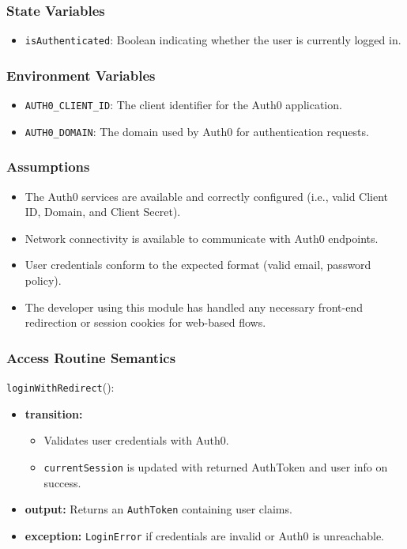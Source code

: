 \documentclass[12pt, titlepage]{article}
\begin{document}
\subsubsection{State Variables}

\begin{itemize}
    \item \texttt{isAuthenticated}: Boolean indicating whether the user is currently logged in.
\end{itemize}

\subsubsection{Environment Variables}

\begin{itemize}
  \item \texttt{AUTH0\_CLIENT\_ID}: The client identifier for the Auth0 application.
  \item \texttt{AUTH0\_DOMAIN}: The domain used by Auth0 for authentication requests.
\end{itemize}

\subsubsection{Assumptions}

\begin{itemize}
    \item The Auth0 services are available and correctly configured (i.e., valid Client ID, Domain, and Client Secret).
    \item Network connectivity is available to communicate with Auth0 endpoints.
    \item User credentials conform to the expected format (valid email, password policy).
    \item The developer using this module has handled any necessary front-end redirection or session cookies for web-based flows.
\end{itemize}

\subsubsection{Access Routine Semantics}

\noindent \texttt{loginWithRedirect}():
\begin{itemize}
    \item \textbf{transition:}
    \begin{itemize}
        \item Validates user credentials with Auth0.
        \item \texttt{currentSession} is updated with returned AuthToken and user info on success.
    \end{itemize}
    \item \textbf{output:} Returns an \texttt{AuthToken} containing user claims.
    \item \textbf{exception:} \texttt{LoginError} if credentials are invalid or Auth0 is unreachable.
\end{itemize}
\end{document}
